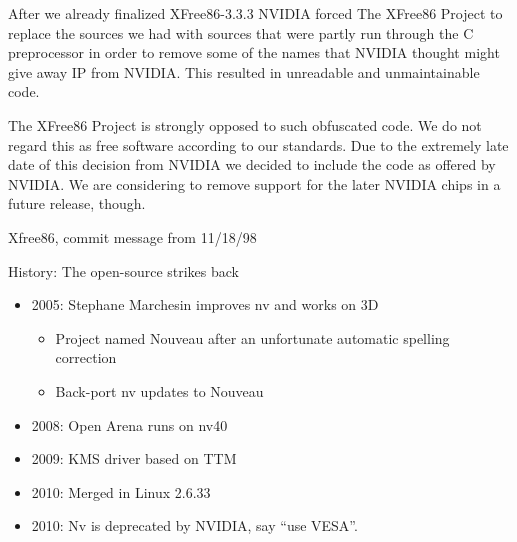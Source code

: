 \documentclass[11pt,english,compress]{beamer}
\begin{document}
	\begin{frame}
		\begin{block}{}
			After we already finalized XFree86-3.3.3 NVIDIA forced The XFree86 Project
			to replace the sources we had with sources that were partly run through the
			C preprocessor in order to remove some of the names that NVIDIA thought
			might give away IP from NVIDIA. This resulted in unreadable and unmaintainable
			code.
		\end{block}

		\begin{block}{}
			The XFree86 Project is strongly opposed to such obfuscated code. We do not
			regard this as free software according to our standards. Due to the extremely
			late date of this decision from NVIDIA we decided to include the code as
			offered by NVIDIA. We are considering to remove support for the later NVIDIA
			chips in a future release, though.
		\end{block}

		 Xfree86, commit message from 11/18/98
	\end{frame}

	\begin{frame}
		\begin{block}{History: The open-source strikes back}
			\begin{itemize}
				\item 2005: Stephane Marchesin improves nv and works on 3D
				\begin{itemize}
					\item Project named Nouveau after an unfortunate automatic spelling correction
					\item Back-port nv updates to Nouveau
				\end{itemize}
				\item 2008: Open Arena runs on nv40
				\item 2009: KMS driver based on TTM
				\item 2010: Merged in Linux 2.6.33
				\item 2010: Nv is deprecated by NVIDIA, say ``use VESA''.
			\end{itemize}
		\end{block}
	\end{frame}
\end{document}
